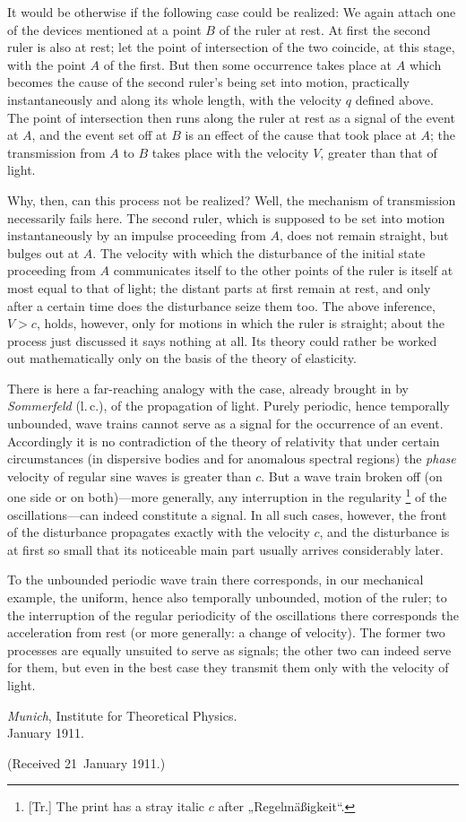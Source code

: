 \documentclass[12pt,a4paper]{article}
\newcounter{trnote}
\newcommand{\trnote}[1]{\stepcounter{trnote}\begingroup\renewcommand{\thefootnote}{\alph{trnote}}%
  \footnote[\value{trnote}]{[Tr.] #1}\endgroup}
\begin{document}
It would be otherwise if the following case could be realized:
We again attach one of the devices mentioned at a point $B$ of the ruler at rest.
At first the second ruler is also at rest; let the point of intersection of the two coincide, at this stage, with the point $A$ of the first.
But then some occurrence takes place at $A$ which becomes the cause of the second ruler's being set into motion, practically instantaneously and along its whole length, with the velocity $q$ defined above.
The point of intersection then runs along the ruler at rest as a signal of the event at $A$, and the event set off at $B$ is an effect of the cause that took place at $A$; the transmission from $A$ to $B$ takes place with the velocity $V$, greater than that of light.

Why, then, can this process not be realized?
Well, the mechanism of transmission necessarily fails here.
The second ruler, which is supposed to be set into motion instantaneously by an impulse proceeding from $A$, does not remain straight, but bulges out at $A$.
The velocity with which the disturbance of the initial state proceeding from $A$ communicates itself to the other points of the ruler is itself at most equal to that of light; the distant parts at first remain at rest, and only after a certain time does the disturbance seize them too.
The above inference, $V > c$, holds, however, only for motions in which the ruler is straight; about the process just discussed it says nothing at all.
Its theory could rather be worked out mathematically only on the basis of the theory of elasticity.

There is here a far-reaching analogy with the case, already brought in by \emph{Sommerfeld} (l.\,c.), of the propagation of light.
Purely periodic, hence temporally unbounded, wave trains cannot serve as a signal for the occurrence of an event.
Accordingly it is no contradiction of the theory of relativity that under certain circumstances (in dispersive bodies and for anomalous spectral regions) the \emph{phase} velocity of regular sine waves is greater than $c$.
But a wave train broken off (on one side or on both)---more generally, any interruption in the regularity\trnote{The print has a stray italic $c$ after „Regelmäßigkeit“.} of the oscillations---can indeed constitute a signal.
In all such cases, however, the front of the disturbance propagates exactly with the velocity $c$, and the disturbance is at first so small that its noticeable main part usually arrives considerably later.

To the unbounded periodic wave train there corresponds, in our mechanical example, the uniform, hence also temporally unbounded, motion of the ruler; to the interruption of the regular periodicity of the oscillations there corresponds the acceleration from rest (or more generally: a change of velocity).
The former two processes are equally unsuited to serve as signals; the other two can indeed serve for them, but even in the best case they transmit them only with the velocity of light.

\emph{Munich}, Institute for Theoretical Physics.\\
January 1911.

\begin{flushright}\small (Received 21~January 1911.)\end{flushright}
\end{document}
